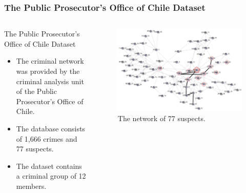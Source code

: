 \documentclass[aspectratio=169]{beamer}
\begin{document}
\begin{frame}
\frametitle{The Public Prosecutor’s Office of Chile Dataset}
\begin{columns}
  \begin{block}{The Public Prosecutor’s Office of Chile Dataset}
    \begin{itemize}
      \item The criminal network was provided by the criminal analysis unit of the Public Prosecutor’s Office of Chile.
      \item The database consists of 1,666 crimes and 77 suspects.
      \item The dataset contains a criminal group of 12 members.
    \end{itemize}
  \end{block}
    \begin{figure}[ht]
      \centering
      \includegraphics[width=\textwidth]{images/network.pdf}
      \caption{\footnotesize The network of 77 suspects.}
    \end{figure}
  \end{columns}
\end{frame}
\end{document}
